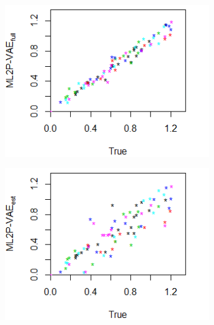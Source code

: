 \begin{figure}[h]
\centering
{}\\
    \begin{subfigure}{.32\textwidth}
      \centering
      \includegraphics[width=.9\linewidth]{img/ml_journal_results/6skills/vae_full_disc_6skills.png}
    \end{subfigure}
    \begin{subfigure}{.32\textwidth}
      \centering
      \includegraphics[width=.9\linewidth]{img/ml_journal_results/6skills/vae_est_disc_6skills.png}
    \end{subfigure}
    \begin{subfigure}{.32\textwidth}
      \centering

\end{subfigure}
\end{figure}
